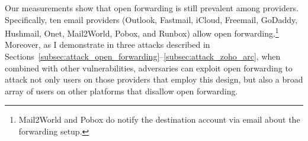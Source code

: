 


Our measurements show that open forwarding is still prevalent among providers.
Specifically, ten email providers (Outlook, Fastmail, iCloud, Freemail, GoDaddy, Hushmail,
Onet, Mail2World, Pobox, and Runbox) allow open
forwarding.\footnote{Mail2World and Pobox do notify the destination account
via email about the forwarding setup.}  Moreover, as I demonstrate in three
attacks described in
Sections~\ref{subsec:attack_open_forwarding}--\ref{subsec:attack_zoho_arc},
when combined with other vulnerabilities, adversaries can exploit open
forwarding to attack not only users on those providers that employ
this design, but also a broad array of users on other platforms that
disallow open forwarding.




